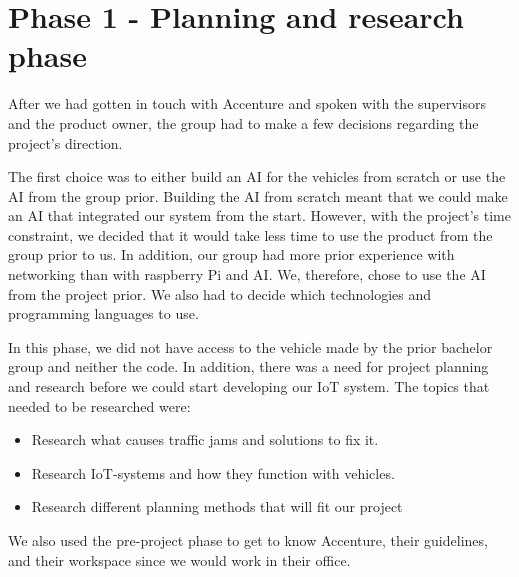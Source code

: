 \section{Phase 1 - Planning and research phase}

After we had gotten in touch with Accenture and spoken with the supervisors and the product owner, the group had to make a few decisions regarding the project's direction.

The first choice was to either build an AI for the vehicles from scratch or use the AI from the group prior. Building the AI from scratch meant that we could make an AI that integrated our system from the start. However, with the project's time constraint, we decided that it would take less time to use the product from the group prior to us. In addition, our group had more prior experience with networking than with raspberry Pi and AI. We, therefore, chose to use the AI from the project prior. We also had to decide which technologies and programming languages to use.

In this phase, we did not have access to the vehicle made by the prior bachelor group and neither the code. In addition, there was a need for project planning and research before we could start developing our IoT system. The topics that needed to be researched were:

\begin{itemize}
\item Research what causes traffic jams and solutions to fix it.
\item Research IoT-systems and how they function with vehicles.
\item Research different planning methods that will fit our project
\end{itemize}
We also used the pre-project phase to get to know Accenture, their guidelines, and their workspace since we would work in their office.








\clearpage